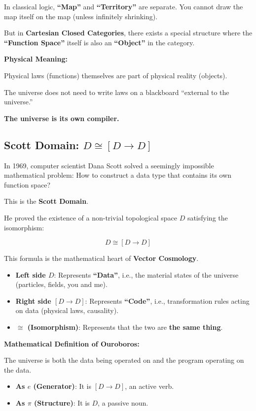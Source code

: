 In classical logic, \textbf{``Map''} and \textbf{``Territory''} are separate. You cannot draw the map itself on the map (unless infinitely shrinking).

But in \textbf{Cartesian Closed Categories}, there exists a special structure where the \textbf{``Function Space''} itself is also an \textbf{``Object''} in the category.

\textbf{Physical Meaning:}

Physical laws (functions) themselves are part of physical reality (objects).

The universe does not need to write laws on a blackboard ``external to the universe.''

\textbf{The universe is its own compiler.}

\subsection{Scott Domain: $D \cong [D \to D]$}

In 1969, computer scientist Dana Scott solved a seemingly impossible mathematical problem: How to construct a data type that contains its own function space?

This is the \textbf{Scott Domain}.

He proved the existence of a non-trivial topological space $D$ satisfying the isomorphism:

\[D \cong [D \to D]\]

This formula is the mathematical heart of \textbf{Vector Cosmology}.

\begin{itemize}
\item \textbf{Left side $D$}: Represents \textbf{``Data''}, i.e., the material states of the universe (particles, fields, you and me).

\item \textbf{Right side $[D \to D]$}: Represents \textbf{``Code''}, i.e., transformation rules acting on data (physical laws, causality).

\item \textbf{$\cong$ (Isomorphism)}: Represents that the two are \textbf{the same thing}.
\end{itemize}

\textbf{Mathematical Definition of Ouroboros:}

The universe is both the data being operated on and the program operating on the data.

\begin{itemize}
\item \textbf{As $e$ (Generator)}: It is $[D \to D]$, an active verb.

\item \textbf{As $\pi$ (Structure)}: It is $D$, a passive noun.
\end{itemize}

